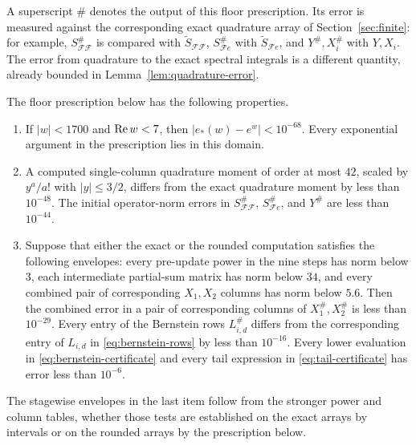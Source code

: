 A superscript $\#$ denotes the output of this floor prescription.  Its
error is measured against the corresponding exact quadrature array of
Section~\ref{sec:finite}: for example,
$S^\#_{\mathcal F\mathcal F}$ is compared with
$\widetilde S_{\mathcal F\mathcal F}$, $S^\#_{\mathcal F e}$ with
$\widetilde S_{\mathcal F e}$, and $Y^\#,X_i^\#$ with $Y,X_i$.
The error from quadrature to the exact spectral integrals is a different
quantity, already bounded in Lemma~\ref{lem:quadrature-error}.

\begin{lemma}
\label{lem:rational-roundoff}
The floor prescription below has the following properties.
\begin{enumerate}
\item If $|w|<1700$ and $\operatorname{Re} w<7$, then $|e_*(w)-e^w|<10^{-68}$.
Every exponential argument in the prescription lies in this domain.
\item A computed single-column quadrature moment of order at most $42$,
scaled by $y^a/a!$ with $|y|\le3/2$, differs from the exact quadrature
moment by less than $10^{-48}$.  The initial operator-norm errors in
$S^\#_{\mathcal F\mathcal F}$, $S^\#_{\mathcal F e}$, and $Y^\#$ are
less than $10^{-44}$.
\item Suppose that either the exact or the rounded computation satisfies
the following envelopes: every pre-update power in the nine steps has norm
below $3$, each intermediate partial-sum matrix has norm below $34$, and
every combined pair of corresponding $X_1,X_2$ columns has norm below $5.6$.
Then the combined error in a pair of corresponding columns of
$X_1^\#,X_2^\#$ is less than $10^{-29}$.
Every entry of the Bernstein rows $L_{i,d}^\#$ differs from the
corresponding entry of $L_{i,d}$ in \eqref{eq:bernstein-rows} by less than
$10^{-16}$.  Every lower evaluation in \eqref{eq:bernstein-certificate}
and every tail expression in \eqref{eq:tail-certificate} has error less
than $10^{-6}$.
\end{enumerate}
The stagewise envelopes in the last item follow from the stronger power and
column tables, whether those tests are established on the exact arrays by
intervals or on the rounded arrays by the prescription below.
\end{lemma}

